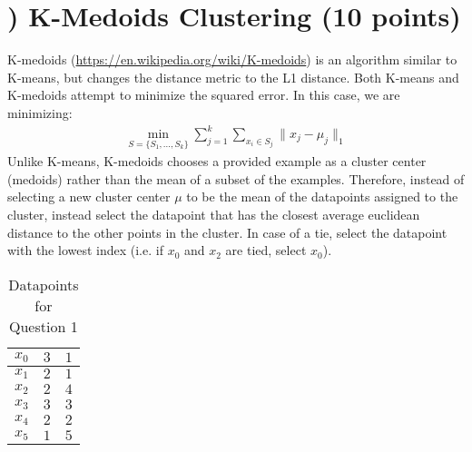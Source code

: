 \documentclass[11pt]{article}
\newcounter{QuestionCounter}
\newcounter{SubQuestionCounter}[QuestionCounter]
\newcommand{\newquestion}{\stepcounter{QuestionCounter}\setcounter{SubQuestionCounter}{1}\newpage}
\begin{document}
\newquestion
\section*{) K-Medoids Clustering (10 points)}
K-medoids (\url{https://en.wikipedia.org/wiki/K-medoids}) is an algorithm similar to K-means, but changes the distance metric to the L1 distance. Both K-means and K-medoids attempt to minimize the squared error. In this case, we are minimizing:
\begin{align}
\min_{S=\{S_1,...,S_k\}}\sum_{j=1}^k\sum_{x_i\in S_j}\|x_j-\mu_j\|_1
\end{align}
Unlike K-means, K-medoids chooses a provided example as a cluster center (medoids) rather than the mean of a subset of the examples.  Therefore, instead of selecting a new cluster center $\mu$ to be the mean of the datapoints assigned to the cluster, instead select the datapoint that has the closest average euclidean distance to the other points in the cluster.  In case of a tie, select the datapoint with the lowest index (i.e. if $x_0$ and $x_2$ are tied, select $x_0$).
 
\begin{table}[h]
\centering
\begin{tabular}{|c|c|c|}
\hline
$x_0$ & $3$ & $1$ \\ \hline
$x_1$ & $2$ & $1$ \\ \hline
$x_2$ & $2$ & $4$ \\ \hline
$x_3$ & $3$ & $3$ \\ \hline
$x_4$ & $2$ & $2$ \\ \hline
$x_5$ & $1$ & $5$ \\ \hline

\end{tabular}
 \caption{Datapoints for Question 1}

\end{table}
\end{document}
